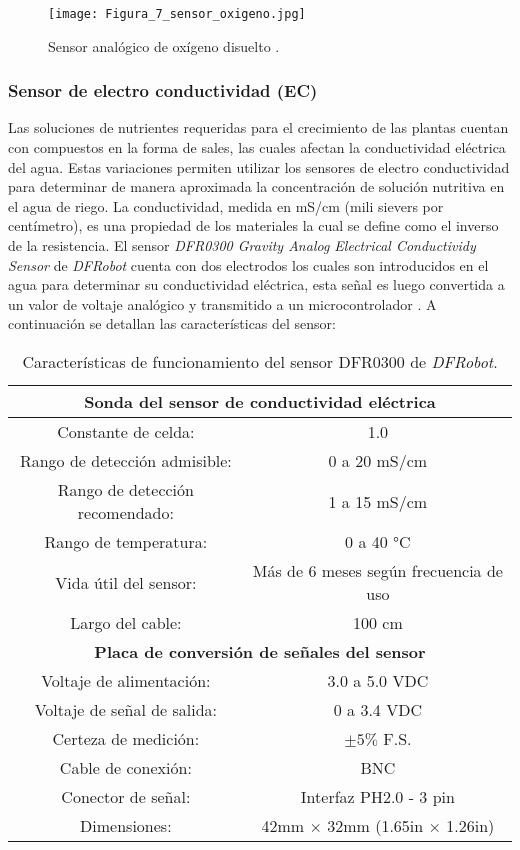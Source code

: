 \begin{figure}[H]
	\centering
	\texttt{[image: Figura\_7\_sensor\_oxigeno.jpg]}
	\caption{Sensor analógico de oxígeno disuelto \cite{DFRobot_DOsensor}.}
	\label{fig:mesh7}
\end{figure}
	
	
\subsubsection*{Sensor de electro conductividad (EC)}
Las soluciones de nutrientes requeridas para el crecimiento de las plantas cuentan con compuestos en la forma de sales, las cuales afectan la conductividad eléctrica del agua. Estas variaciones permiten utilizar los sensores de electro conductividad para determinar de manera aproximada la concentración de solución nutritiva en el agua de riego. La conductividad, medida en mS/cm (mili sievers por centímetro), es una propiedad de los materiales la cual se define como el inverso de la resistencia. El sensor \textit{DFR0300 Gravity Analog Electrical Conductividy Sensor} de \textit{DFRobot} cuenta con dos electrodos los cuales son introducidos en el agua para determinar su conductividad eléctrica, esta señal es luego convertida a un valor de voltaje analógico y transmitido a un microcontrolador \cite{DFRobot_ECsensor}. A continuación se detallan las características del sensor:

\begin{table}[H]
	\centering
	\begin{tabular}{|c|c|}
		\hline
		\multicolumn{2}{|c|}{\textbf{Sonda del sensor de conductividad eléctrica}}\\ \hline
		Constante de celda: & 1.0 \\ \hline
		Rango de detección admisible: & 0 a 20 mS/cm \\ \hline
		Rango de detección recomendado: & 1 a 15 mS/cm \\ \hline
		Rango de temperatura: & 0 a 40 °C \\ \hline
		Vida útil del sensor: & Más de 6 meses según frecuencia de uso \\ \hline
		Largo del cable: & 100 cm \\ \hline
		\multicolumn{2}{|c|}{\textbf{Placa de conversión de señales del sensor}}\\ \hline 
		Voltaje de alimentación: & 3.0 a 5.0 VDC \\ \hline
		Voltaje de señal de salida: & 0 a 3.4 VDC \\ \hline
		Certeza de medición: & $\pm 5\%$ F.S. \\ \hline
		Cable de conexión: & BNC \\ \hline
		Conector de señal: & Interfaz PH2.0 - 3 pin \\ \hline
		Dimensiones: & 42mm $\times$ 32mm (1.65in $\times$ 1.26in) \\ \hline
	\end{tabular}
	\caption{Características de funcionamiento del sensor DFR0300 de \textit{DFRobot}.}
	\label{Cuadro2}
\end{table}


